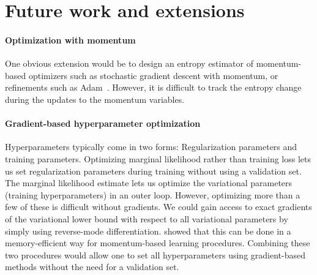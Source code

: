 \documentclass[]{article}
\begin{document}




\section{Future work and extensions}

\paragraph{Optimization with momentum}
One obvious extension would be to design an entropy estimator of 
momentum-based optimizers such as stochastic gradient descent with momentum, or
refinements such as Adam~\citep{Adam14}.
However, it is difficult to track the entropy change during the updates to the momentum variables.


\paragraph{Gradient-based hyperparameter optimization}
Hyperparameters typically come in two forms:
Regularization parameters and training parameters.
Optimizing marginal likelihood rather than training loss lets us set regularization parameters during training without using a validation set.
The marginal likelihood estimate lets us optimize the variational parameters (training hyperparameters) in an outer loop.
However, optimizing more than a few of these is difficult without gradients.
We could gain access to exact gradients of the variational lower bound with respect to all variational parameters by simply using reverse-mode differentiation.
\citet{domke2012generic, MacDuvAda2015hyper} showed that this can be done in a memory-efficient way for momentum-based learning procedures.
Combining these two procedures would allow one to set all hyperparameters using gradient-based methods without the need for a validation set.
\end{document}
